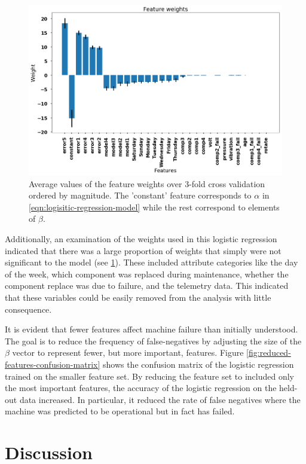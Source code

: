 \documentclass{article}
\begin{document}
\begin{figure}[!ht]
\centering
\includegraphics[width=5.5in]{full-feature-weights}
\caption{Average values of the feature weights over 3-fold cross validation ordered by magnitude. The 'constant' feature corresponds to $\alpha$ in \eqref{eqn:logisitic-regression-model} while the rest correspond to elements of $\beta$.}
\label{fig:full-feature-weights}
\end{figure}

Additionally, an examination of the weights used in this logistic regression indicated that there was a large proportion of weights that simply were not significant to the model (see \ref{fig:full-feature-weights}). These included attribute categories like the day of the week, which component was replaced during maintenance, whether the component replace was due to failure, and the telemetry data. This indicated that these variables could be easily removed from the analysis with little consequence.

It is evident that fewer features affect machine failure than initially understood. The goal is to reduce the frequency of false-negatives by adjusting the size of the $\beta$ vector to represent fewer, but more important, features. Figure \ref{fig:reduced-features-confusion-matrix} shows the confusion matrix of the logistic regression trained on the smaller feature set. By reducing the feature set to included only the most important features, the accuracy of the logistic regression on the held-out data increased. In particular, it reduced the rate of false negatives where the machine was predicted to be operational but in fact has failed.

\section{Discussion}
\end{document}

